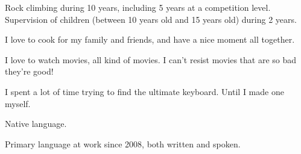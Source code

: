 \begin{rubric}{
}

\entry*[Sport] Rock climbing during 10 years, including 5 years at a competition level. Supervision of children (between 10 years old and 15 years old) during 2 years.

\entry*[Cooking] I love to cook for my family and friends, and have a nice moment all together.


\entry*[Movies] I love to watch movies, all kind of movies. I can't resist movies that are so bad they're good!

 I spent a lot of time trying to find the ultimate keyboard. Until I made one myself.


\entry*[French] Native language.

\entry*[English] Primary language at work since 2008, both written and spoken.

\end{rubric}


